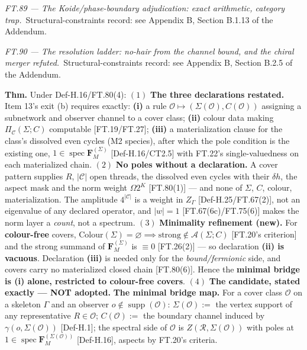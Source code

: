 \medskip\noindent\textit{\texorpdfstring{FT.89 — The Koide/phase-boundary adjudication: exact arithmetic, category trap}{FT.89 - The Koide/phase-boundary adjudication: exact arithmetic, category trap}.}\ Structural-constraints record: see Appendix B, Section B.1.13 of the Addendum.\par\medskip

\medskip\noindent\textit{\texorpdfstring{FT.90 — The resolution ladder: no-hair from the channel bound, and the chiral merger refuted}{FT.90 - The resolution ladder: no-hair from the channel bound, and the chiral merger refuted}.}\ Structural-constraints record: see Appendix B, Section B.2.5 of the Addendum.\par\medskip

\begin{theorem}\label{tag:FT-91}
\textbf{Thm.} Under Def-H.16/FT.80(4): $(1)$ \textbf{The three declarations restated.} Item 13's exit (b) requires exactly: \textbf{(i)} a rule $\mathcal O\mapsto(\Sigma(\mathcal O),C(\mathcal O))$ assigning a subnetwork and observer channel to a cover class; \textbf{(ii)} colour data making $\Pi_{\mathcal C}(\Sigma;C)$ computable [FT.19/FT.27]; \textbf{(iii)} a materialization clause for the class's dissolved even cycles (M2 species), after which the pole condition is the existing one, $1\in\operatorname{spec}\mathbf F_M^{(\Sigma)}$ [Def-H.16/CT2.5] with FT.22's single-valuedness on each materialized chain. $(2)$ \textbf{No poles without a declaration.} A cover pattern supplies $R$, $|\mathcal C|$ open threads, the dissolved even cycles with their $\delta h$, the aspect mask and the norm weight $\Omega2^K$ [FT.80(1)] — and none of $\Sigma$, $C$, colour, materialization. The amplitude $4^{|\mathcal C|}$ is a weight in $Z_\Gamma$ [Def-H.25/FT.67(2)], not an eigenvalue of any declared operator, and $|w|=1$ [FT.67(6c)/FT.75(6)] makes the norm layer a \textit{count}, not a spectrum. $(3)$ \textbf{Minimality refinement (new).} For \textbf{colour-free} covers, $\mathrm{Colour}(\Sigma)=\varnothing\implies\text{strong}\notin\mathcal A(\Sigma;C)$ [FT.20's criterion] and the strong summand of $\mathbf F_M^{(\Sigma)}$ is $\equiv0$ [FT.26(2)] — so declaration \textbf{(ii) is vacuous}. Declaration \textbf{(iii)} is needed only for the \textit{bound/fermionic} side, and covers carry no materialized closed chain [FT.80(6)]. Hence the \textbf{minimal bridge is (i) alone, restricted to colour-free covers}. $(4)$ \textbf{The candidate, stated exactly — NOT adopted.} \textbf{The minimal bridge map.} For a cover class $\mathcal O$ on a skeleton $\Gamma$ and an observer $o\notin\operatorname{supp}(\mathcal O)$: $\Sigma(\mathcal O):=$ the vertex support of any representative $R\in\mathcal O$; $C(\mathcal O):=$ the boundary channel induced by $\gamma(o,\Sigma(\mathcal O))$ [Def-H.1]; the spectral side of $\mathcal O$ is $Z(\mathcal R,\Sigma(\mathcal O))$ with poles at $1\in\operatorname{spec}\mathbf F_M^{(\Sigma(\mathcal O))}$ [Def-H.16], aspects by FT.20's criteria.


\end{theorem}
